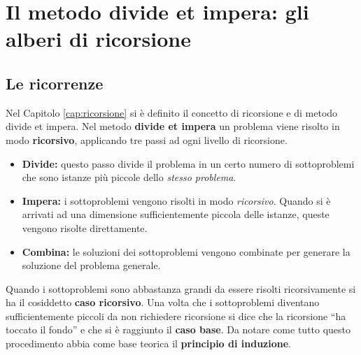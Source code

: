 \chapter{Il metodo divide et impera: gli alberi di ricorsione}\label{cap:ricorrenze}

\section{Le ricorrenze}
Nel Capitolo \ref{cap:ricorsione} si è definito il concetto di ricorsione e di metodo divide et impera. Nel metodo \textbf{divide et impera} un problema viene risolto in modo \textbf{ricorsivo}, applicando tre passi ad ogni livello di ricorsione.
\begin{itemize}
	\item \textbf{Divide:} questo passo divide il problema in un certo numero di sottoproblemi che sono istanze più piccole dello \textit{stesso problema}.
	\item \textbf{Impera:} i sottoproblemi vengono risolti in modo \textit{ricorsivo}. Quando si è arrivati ad una dimensione sufficientemente piccola delle istanze, queste vengono risolte direttamente.
	\item \textbf{Combina:} le soluzioni dei sottoproblemi vengono combinate per generare la soluzione del problema generale.
\end{itemize}

Quando i sottoproblemi sono abbastanza grandi da essere risolti ricorsivamente si ha il cosiddetto \textbf{caso ricorsivo}. Una volta che i sottoproblemi diventano sufficientemente piccoli da non richiedere ricorsione si dice che la ricorsione ``ha toccato il fondo'' e che si è raggiunto il \textbf{caso base}. Da notare come tutto questo procedimento abbia come base teorica il \textbf{principio di induzione}.


